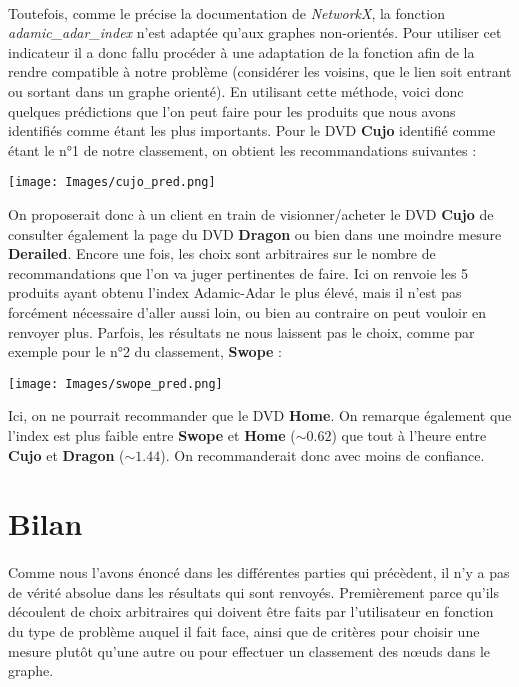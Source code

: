 \documentclass[14pt, openany]{article}
\begin{document}
\paragraph{}
Toutefois, comme le précise la documentation de \textit{NetworkX}, la fonction \textit{adamic\_adar\_index} n'est adaptée qu'aux graphes non-orientés. Pour utiliser cet indicateur il a donc fallu procéder à une adaptation de la fonction afin de la rendre compatible à notre problème (considérer les voisins, que le lien soit entrant ou sortant dans un graphe orienté). En utilisant cette méthode, voici donc quelques prédictions que l'on peut faire pour les produits que nous avons identifiés comme étant les plus importants. Pour le DVD \textbf{Cujo} identifié comme étant le n°1 de notre classement, on obtient les recommandations suivantes :\\
\begin{center}
\texttt{[image: Images/cujo\_pred.png]}
\end{center}
On proposerait donc à un client en train de visionner/acheter le DVD \textbf{Cujo} de consulter également la page du DVD \textbf{Dragon} ou bien dans une moindre mesure \textbf{Derailed}. Encore une fois, les choix sont arbitraires sur le nombre de recommandations que l'on va juger pertinentes de faire. Ici on renvoie les 5 produits ayant obtenu l'index Adamic-Adar le plus élevé, mais il n'est pas forcément nécessaire d'aller aussi loin, ou bien au contraire on peut vouloir en renvoyer plus. Parfois, les résultats ne nous laissent pas le choix, comme par exemple pour le n°2 du classement, \textbf{Swope} :\\
\begin{center}
\texttt{[image: Images/swope\_pred.png]}
\end{center}
Ici, on ne pourrait recommander que le DVD \textbf{Home}. On remarque également que l'index est plus faible entre \textbf{Swope} et \textbf{Home} ($\sim0.62$) que tout à l'heure entre \textbf{Cujo} et \textbf{Dragon} ($\sim1.44$). On recommanderait donc avec moins de confiance.
\section{Bilan}
\paragraph{}
Comme nous l'avons énoncé dans les différentes parties qui précèdent, il n'y a pas de vérité absolue dans les résultats qui sont renvoyés. Premièrement parce qu'ils découlent de choix arbitraires qui doivent être faits par l'utilisateur en fonction du type de problème auquel il fait face, ainsi que de critères pour choisir une mesure plutôt qu'une autre ou pour effectuer un classement des nœuds dans le graphe.
\end{document}
